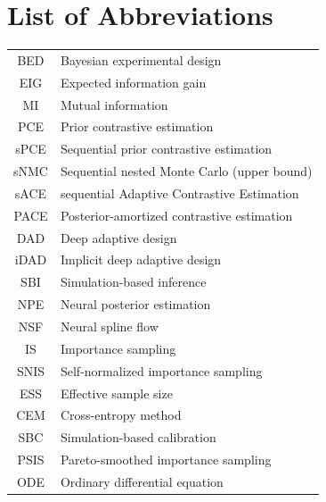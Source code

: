 \chapter{List of Abbreviations}
        \begin{table}[h]
                \centering
                \begin{tabular}{cl}
                                BED   & Bayesian experimental design \\
                                EIG   & Expected information gain \\
                                MI    & Mutual information \\
                                PCE   & Prior contrastive estimation \\
                                sPCE  & Sequential prior contrastive estimation \\
                                sNMC  & Sequential nested Monte Carlo (upper bound) \\
                                sACE & sequential Adaptive Contrastive Estimation \\
                                PACE  & Posterior-amortized contrastive estimation \\
                                DAD   & Deep adaptive design \\
                                iDAD  & Implicit deep adaptive design \\
                                SBI   & Simulation-based inference \\
                                NPE   & Neural posterior estimation \\
                                NSF   & Neural spline flow \\
                                IS    & Importance sampling \\
                                SNIS  & Self-normalized importance sampling \\
                                ESS   & Effective sample size \\
                                CEM   & Cross-entropy method \\
                                SBC   & Simulation-based calibration \\
                                PSIS  & Pareto-smoothed importance sampling \\
                                ODE   & Ordinary differential equation \\
                \end{tabular}
        \end{table}
